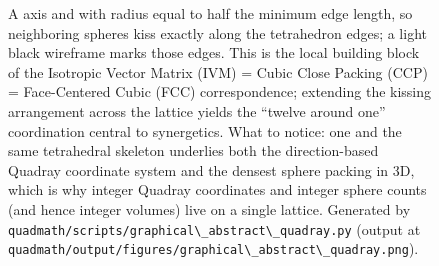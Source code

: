 \documentclass[
  10pt,
]{article}
\newcommand{\passthrough}[1]{#1}
\begin{document}
\begin{figure}
{A axis and with radius equal to half the minimum edge length, so
neighboring spheres kiss exactly along the tetrahedron edges; a light
black wireframe marks those edges. This is the local building block of
the Isotropic Vector Matrix (IVM) = Cubic Close Packing (CCP) =
Face-Centered Cubic (FCC) correspondence; extending the kissing
arrangement across the lattice yields the ``twelve around one''
coordination central to synergetics. What to notice: one and the same
tetrahedral skeleton underlies both the direction-based Quadray
coordinate system and the densest sphere packing in 3D, which is why
integer Quadray coordinates and integer sphere counts (and hence integer
volumes) live on a single lattice. Generated by
\protect\passthrough{\lstinline!quadmath/scripts/graphical\_abstract\_quadray.py!}
(output at
\protect\passthrough{\lstinline!quadmath/output/figures/graphical\_abstract\_quadray.png!}).}
\end{figure}
\end{document}
